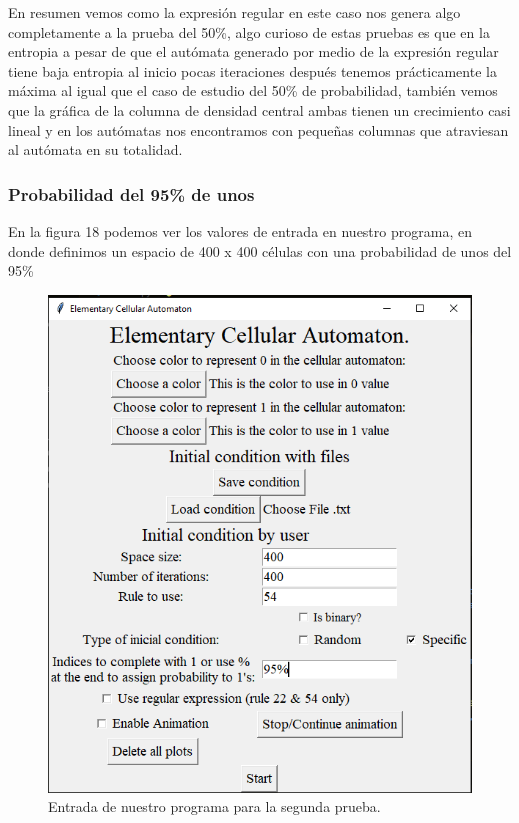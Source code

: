 \documentclass[11pt]{article}
\begin{document}
		 En resumen vemos como la expresión regular en este caso nos genera algo completamente a la prueba del 50\%, algo curioso de estas pruebas es que en la entropia a pesar de que el autómata generado por medio de la expresión regular tiene baja entropia al inicio pocas iteraciones después tenemos prácticamente la máxima al igual que el caso de estudio del 50\% de probabilidad, también vemos que la gráfica de la columna de densidad central ambas tienen un crecimiento casi lineal y en los autómatas nos encontramos con pequeñas columnas que atraviesan al autómata en su totalidad.\newpage
		\subsubsection{Probabilidad del 95\% de unos}
		En la figura 18 podemos ver los valores de entrada en nuestro programa, en donde definimos un espacio de 400 x 400 células con una probabilidad de unos del 95\%		
		\begin{figure}[H]
			\centering
			\includegraphics[scale=0.5]{resources/RegEx54/95_prob_entrada.png}
			\caption{Entrada de nuestro programa para la segunda prueba.}\label{fig:picture}
		\end{figure}
\end{document}
